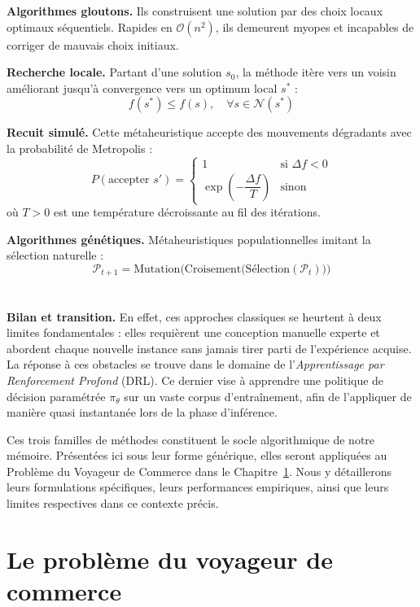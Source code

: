 \documentclass[12pt, a4paper, twoside, openright]{book}
\begin{document}
	\textbf{Algorithmes gloutons.}
	Ils construisent une solution par des choix locaux optimaux séquentiels.
	Rapides en $\mathcal{O}(n^2)$, ils demeurent myopes et incapables de
	corriger de mauvais choix initiaux.
	
	\textbf{Recherche locale.}
	Partant d'une solution $s_0$, la méthode itère vers un voisin améliorant
	jusqu'à convergence vers un optimum local $s^*$ :
	$$
	f(s^*) \leq f(s), \quad \forall s \in \mathcal{N}(s^*)
	$$
	
	
	\textbf{Recuit simulé.}
	Cette métaheuristique accepte des mouvements dégradants avec la
	probabilité de Metropolis :
	$$
	P(\text{accepter } s') = \begin{cases}
		1 & \text{si } \Delta f < 0 \\
		\exp\!\left(-\dfrac{\Delta f}{T}\right) & \text{sinon}
	\end{cases}
	$$
	où $T > 0$ est une température décroissante au fil des itérations.
	
	\textbf{Algorithmes génétiques.}
	Métaheuristiques populationnelles imitant la sélection naturelle :
	$$
	\mathcal{P}_{t+1} =
	\text{Mutation}\Big(\text{Croisement}
	\big(\text{Sélection}(\mathcal{P}_t)\big)\Big)
	$$
	\\
	\\
	\textbf{Bilan et transition.}
	En effet, ces approches classiques se heurtent à deux limites fondamentales : elles requièrent une conception manuelle experte et abordent chaque nouvelle instance sans jamais tirer parti de l'expérience acquise. La réponse à ces obstacles se trouve dans le domaine de l'\textit{Apprentissage par Renforcement Profond} (DRL). Ce dernier vise à apprendre une politique de décision paramétrée $\pi_\theta$ sur un vaste corpus d'entraînement, afin de l'appliquer de manière quasi instantanée lors de la phase d'inférence.
	
	Ces trois familles de méthodes constituent le socle algorithmique de notre mémoire. Présentées ici sous leur forme générique, elles seront appliquées au Problème du Voyageur de Commerce dans le Chapitre~\ref{chap:tsp}. Nous y détaillerons leurs formulations spécifiques, leurs performances empiriques, ainsi que leurs limites respectives dans ce contexte précis.

	
	
	\chapter{Le probl\`eme du voyageur de commerce}
	\label{chap:tsp}
	
\end{document}
